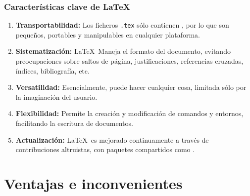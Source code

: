\documentclass{beamer}
\begin{document}
\begin{frame}[fragile]
  \frametitle{Caracter\'isticas clave de \LaTeX}

  \begin{enumerate}
  \item \textbf{Transportabilidad:}
    Los ficheros \texttt{.tex} s\'olo contienen
    , por lo que son peque\~nos, portables
    y manipulables en cualquier plataforma.
    \pause
  \item \textbf{Sistematizaci\'on:}
    \LaTeX\, Maneja el formato del documento, evitando preocupaciones sobre
    saltos de p\'agina, justificaciones, referencias cruzadas,
    \'indices, \alert{bibliograf\'ia}, etc.
    \pause
  \item \textbf{Versatilidad:}
    Esencialmente, puede hacer cualquier cosa, limitada s\'olo por la
    imaginaci\'on del usuario.
    \pause
  \item \textbf{Flexibilidad:}
    Permite la creaci\'on y modificaci\'on de comandos y
    entornos, facilitando la escritura de documentos.
    \pause
  \item \textbf{Actualizaci\'on:}
    \LaTeX\, es mejorado continuamente a trav\'es de contribuciones altruistas,
    con paquetes compartidos como .
  \end{enumerate}

\end{frame}


\section{Ventajas e inconvenientes}
\begin{frame}
  \frametitle{}
  \begin{center}
    \Large{}
  \end{center}
\end{frame}

\end{document}
